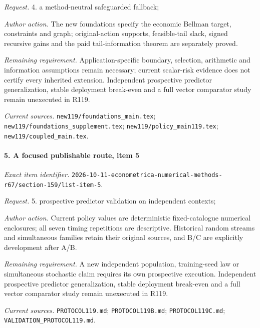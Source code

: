 \par\emph{Request.} 4. a method-neutral safeguarded fallback;

\par\emph{Author action.} The new foundations specify the economic Bellman target, constraints and graph; original-action supports, feasible-tail slack, signed recursive gains and the paid tail-information theorem are separately proved.

\par\emph{Remaining requirement.} Application-specific boundary, selection, arithmetic and information assumptions remain necessary; current scalar-risk evidence does not certify every inherited extension. Independent prospective predictor generalization, stable deployment break-even and a full vector comparator study remain unexecuted in R119.

\par\emph{Current sources.} \nolinkurl{new119/foundations_main.tex}; \nolinkurl{new119/foundations_supplement.tex}; \nolinkurl{new119/policy_main119.tex}; \nolinkurl{new119/coupled_main.tex}.

\paragraph{5. A focused publishable route, item 5}

\emph{Exact item identifier.} \nolinkurl{2026-10-11-econometrica-numerical-methods-r67/section-159/list-item-5}.

\par\emph{Request.} 5. prospective predictor validation on independent contexts;

\par\emph{Author action.} Current policy values are deterministic fixed-catalogue numerical enclosures; all seven timing repetitions are descriptive. Historical random streams and simultaneous families retain their original sources, and B/\allowbreak{}C are explicitly development after A/\allowbreak{}B.

\par\emph{Remaining requirement.} A new independent population, training-seed law or simultaneous stochastic claim requires its own prospective execution. Independent prospective predictor generalization, stable deployment break-even and a full vector comparator study remain unexecuted in R119.

\par\emph{Current sources.} \nolinkurl{PROTOCOL119.md}; \nolinkurl{PROTOCOL119B.md}; \nolinkurl{PROTOCOL119C.md}; \nolinkurl{VALIDATION_PROTOCOL119.md}.

